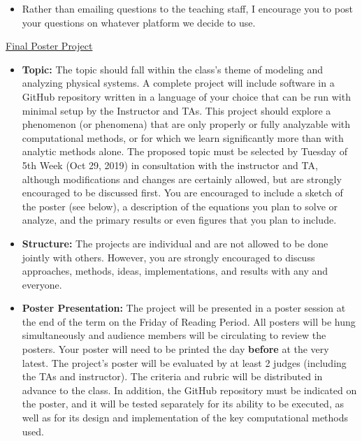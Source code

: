 \begin{itemize}

  \item Rather than emailing questions to the teaching staff, I encourage you to post your questions on whatever platform we decide to use. 


  
\end{itemize}  


\noindent \underline{Final Poster Project}

\begin{itemize}

  \item \textbf{Topic:} The topic should fall within the class's theme of modeling and analyzing physical systems. A complete project will include software in a GitHub repository written in a language of your choice that can be run with minimal setup by the Instructor and TAs. This project should explore a phenomenon (or phenomena) that are only properly or fully analyzable with computational methods, or for which we learn significantly more than with analytic methods alone. The proposed topic must be selected by Tuesday of 5th Week (Oct 29, 2019) in consultation with the instructor and TA, although modifications and changes are certainly allowed, but are strongly encouraged to be discussed first. You are encouraged to include a sketch of the poster (see below), a description of the equations you plan to solve or analyze, and the primary results or even figures that you plan to include.

  \item \textbf{Structure:} The projects are individual and are not allowed to be done jointly with others. However, you are strongly encouraged to discuss approaches, methods, ideas, implementations, and results with any and everyone.

  \item \textbf{Poster Presentation:} The project will be presented in a poster session at the end of the term on the Friday of Reading Period. All posters will be hung simultaneously and audience members will be circulating to review the posters. Your poster will need to be printed the day \textbf{before} at the very latest. The project's poster will be evaluated by at least 2 judges (including the TAs and instructor). The criteria and rubric will be distributed in advance to the class. In addition, the GitHub repository must be indicated on the poster, and it will be tested separately for its ability to be executed, as well as for its design and implementation of the key computational methods used. 
  
\end{itemize}  


